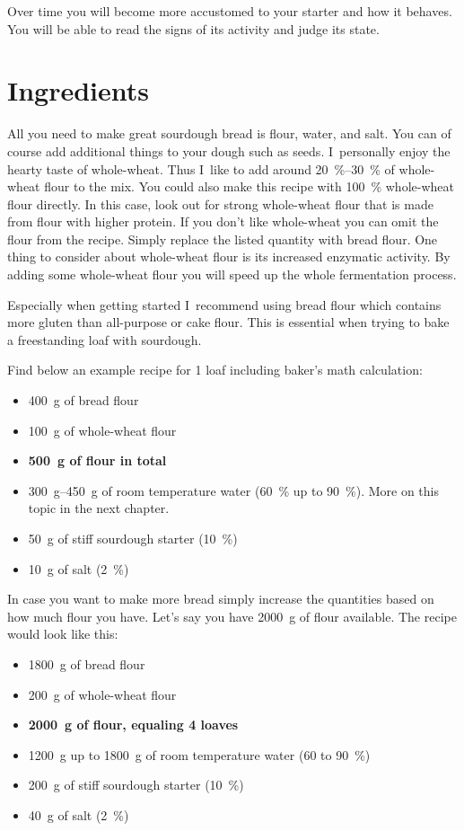 Over time you will become more accustomed to your starter
and how it behaves. You will be able to read the signs of its
activity and judge its state.

\section{Ingredients}

All you need to make great sourdough bread is flour, water, and salt. You
can of course add additional things to your dough such as seeds. I~personally
enjoy the hearty taste of whole-wheat. Thus I~like to add around
\qtyrange{20}{30}{\percent} of whole-wheat flour to the mix. You could also
make this recipe with \qty{100}{\percent}
whole-wheat flour directly. In this case, look out for strong whole-wheat
flour that is made from flour with higher protein. If you don't like whole-wheat
you can omit the flour from the recipe. Simply replace the listed
quantity with bread flour. One thing to consider about whole-wheat
flour is its increased enzymatic activity. By adding some whole-wheat
flour you will speed up the whole fermentation process.

Especially when getting started I~recommend using bread flour which
contains more gluten than all-purpose or cake flour. This is essential
when trying to bake a freestanding loaf with sourdough.

Find below an example recipe for 1 loaf including baker's math calculation:

\begin{itemize}
  \item \qty{400}{\gram} of bread flour
  \item \qty{100}{\gram} of whole-wheat flour
  \item \textbf{\qty{500}{\gram} of flour in total}
  \item \qtyrange{300}{450}{\gram} of room temperature water (\qty{60}{\percent} up to \qty{90}{\percent}). More on
this topic in the next chapter.
  \item \qty{50}{\gram} of stiff sourdough starter (\qty{10}{\percent})
  \item \qty{10}{\gram} of salt (\qty{2}{\percent})
\end{itemize}

In case you want to make more bread simply increase the quantities based on
how much flour you have. Let's say you have \qty{2000}{\gram} of flour available. The
recipe would look like this:

\begin{itemize}
  \item \qty{1800}{\gram} of bread flour
  \item \qty{200}{\gram} of whole-wheat flour
  \item \textbf{\qty{2000}{\gram} of flour, equaling 4 loaves}
  \item \qty{1200}{\gram} up to \qty{1800}{\gram} of room temperature water (60 to \qty{90}{\percent})
  \item \qty{200}{\gram} of stiff sourdough starter (\qty{10}{\percent})
  \item \qty{40}{\gram} of salt (\qty{2}{\percent})
\end{itemize}

